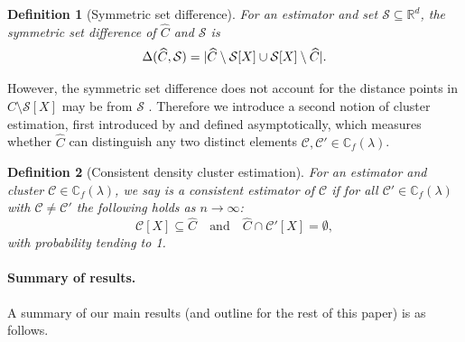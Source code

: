 \documentclass{article}
\DeclarePairedDelimiter\abs{\lvert}{\rvert}
\newcommand{\Reals}{\mathbb{R}}
\newcommand{\1}{\mathbf{1}}
\newcommand{\Xbf}{X}             %
\newcommand{\Cbb}{\mathbb{C}}
\newcommand{\Cset}{\mathcal{C}}
\newcommand{\Cest}{\widehat{C}}
\theoremstyle{aldenthm}
\newtheorem{definition}{Definition}
\theoremstyle{aldenrmrk}
\begin{document}
\begin{definition}[Symmetric set difference]
	\label{def: symmetric_set_diff}
	For an estimator \smash{$\Cest \subseteq \Xbf$} and set
	$\mathcal{S} \subseteq \Reals^d$, the symmetric set difference of $\Cest$ and $\mathcal{S}$ is 
	\begin{equation}
	\label{eqn: misclassification_rate}
	\Delta(\Cest, \mathcal{S}) = \abs{\Cest \setminus \mathcal{S}[\Xbf] \cup \mathcal{S}[\Xbf] \setminus \Cest}.
	\end{equation}
\end{definition}

However, the symmetric set difference does not account for the distance points in $\widehat{C} \setminus \mathcal{S}[\Xbf]$ may be from $\mathcal{S}$ \citep{singh2009}. Therefore we introduce a second notion of cluster estimation, first introduced by \citet{hartigan1981} and defined asymptotically, which measures whether $\widehat{C}$ can distinguish any two distinct elements $\Cset, \Cset' \in \Cbb_f(\lambda)$. 

\begin{definition}[Consistent density cluster estimation]
	\label{def: consistent_density_cluster_estimation}
	For an estimator \smash{$\Cest \subseteq \Xbf$} and cluster 
	$\Cset \in \Cbb_f(\lambda)$, we say \smash{$\Cest$} is a consistent
	estimator of $\Cset$ if for all $\Cset' \in \Cbb_f(\lambda)$ with $\Cset \not=
	\Cset'$ the following holds as $n \to \infty$: 
	\begin{equation}
	\label{eqn: consistent_density_cluster_recovery}
	\Cset[\Xbf] \subseteq \Cest \quad \text{and} \quad
	\Cest \cap \Cset'[\Xbf] = \emptyset,
	\end{equation}
	with probability tending to 1.
\end{definition}
\paragraph{Summary of results.}
A summary of our main results (and outline for the rest of this paper) is as
follows.  
\end{document}
